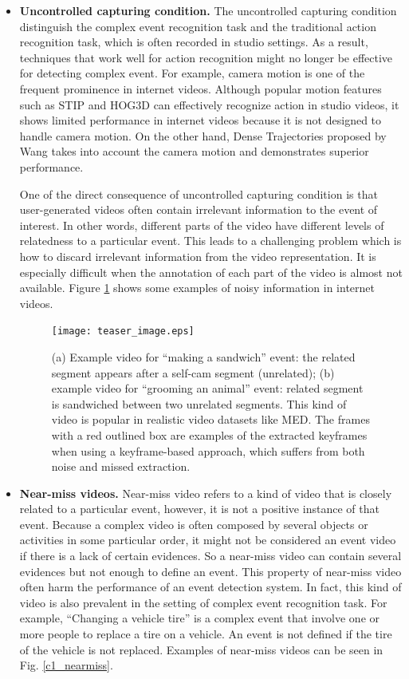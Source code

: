 \begin{itemize}
	\item{\textbf{Uncontrolled capturing condition.}} The uncontrolled capturing condition distinguish the complex event recognition task and the traditional action recognition task, which is often recorded in studio settings. As a result, techniques that work well for action recognition might no longer be effective for detecting complex event. For example, camera motion is one of the frequent prominence in internet videos. Although popular motion features such as STIP and HOG3D can effectively recognize action in studio videos, it shows limited performance in internet videos because it is not designed to handle camera motion. On the other hand, Dense Trajectories proposed by Wang takes into account the camera motion and demonstrates superior performance.
	 
	One of the direct consequence of uncontrolled capturing condition is that user-generated videos often contain irrelevant information to the event of interest. In other words, different parts of the video have different levels of relatedness to a particular event. This leads to a challenging problem which is how to discard irrelevant information from the video representation. It is especially difficult when the annotation of each part of the video is almost not available. Figure \ref{c1_uncontrolled} shows some examples of noisy information in internet videos.
	
	\begin{figure}
		\centering
		\texttt{[image: teaser\_image.eps]}
		\caption{(a) Example video for ``making a sandwich'' event: the related segment appears after a self-cam segment (unrelated); (b) example video for ``grooming an animal'' event: related segment is sandwiched between two unrelated segments. This kind of video is popular in realistic video datasets like MED. The frames with a red outlined box are examples of the extracted keyframes when using a keyframe-based approach, which suffers from both noise and missed extraction.}
		\label{c1_uncontrolled}
	\end{figure}
	 
	\item{\textbf{Near-miss videos.}} Near-miss video refers to a kind of video that is closely related to a particular event, however, it is not a positive instance of that event. Because a complex video is often composed by several objects or activities in some particular order, it might not be considered an event video if there is a lack of certain evidences. So a near-miss video can contain several evidences but not enough to define an event. This property of near-miss video often harm the performance of an event detection system. In fact, this kind of video is also prevalent in the setting of complex event recognition task. For example, ``Changing a vehicle tire'' is a complex event that involve one or more people to replace a tire on a vehicle. An event is not defined if the tire of the vehicle is not replaced. Examples of near-miss videos can be seen in Fig. \ref{c1_nearmiss}.
	

\end{itemize}

